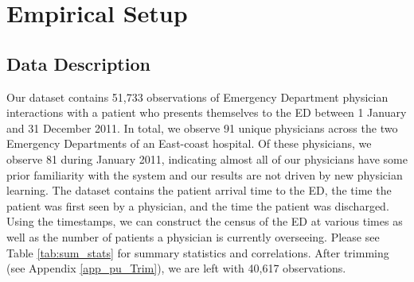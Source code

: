\section{Empirical Setup} \label{Emp_PU}
 \subsection{Data Description}
 Our dataset contains 51,733 observations of Emergency Department physician interactions with a patient who presents themselves to the ED between 1 January and 31 December 2011. In total, we observe 91 unique physicians across the two Emergency Departments of an East-coast hospital. Of these physicians, we observe 81 during January 2011, indicating almost all of our physicians have some prior familiarity with the system and our results are not driven by new physician learning. The dataset contains the patient arrival time to the ED, the time the patient was first seen by a physician, and the time the patient was discharged. Using the timestamps, we can construct the census of the ED at various times as well as the number of patients a physician is currently overseeing. Please see Table \ref{tab:sum_stats} for summary statistics and correlations. After trimming (see Appendix \ref{app_pu_Trim}), we are left with 40,617 observations. 
  
